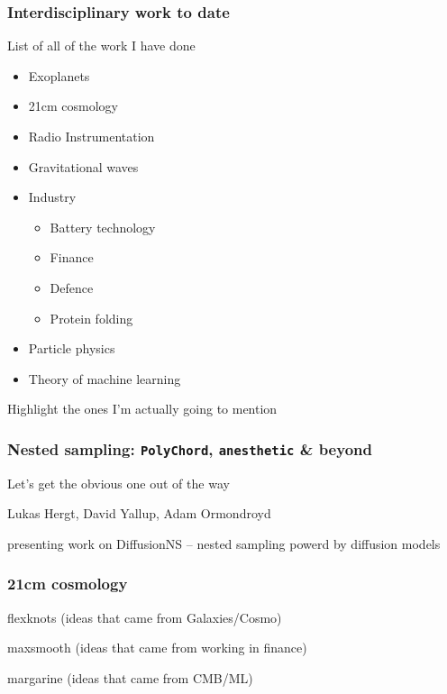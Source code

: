 \documentclass[aspectratio=169, handout]{beamer}
\begin{document}
\begin{frame}
    \frametitle{Interdisciplinary work to date}

    List of all of the work I have done
    \begin{itemize}
        \item Exoplanets
        \item 21cm cosmology
        \item Radio Instrumentation
        \item Gravitational waves
        \item Industry
            \begin{itemize}
                \item Battery technology
                \item Finance
                \item Defence
                \item Protein folding
            \end{itemize}
        \item Particle physics
        \item Theory of machine learning
    \end{itemize}

    Highlight the ones I'm actually going to mention
\end{frame}

\begin{frame}
    \frametitle{Nested sampling: \texttt{PolyChord}, \texttt{anesthetic} \& beyond}
    Let's get the obvious one out of the way

    Lukas Hergt, David Yallup, Adam Ormondroyd

    presenting work on DiffusionNS -- nested sampling powerd by diffusion models
\end{frame}

\begin{frame}
    \frametitle{21cm cosmology}

    flexknots (ideas that came from Galaxies/Cosmo)

    maxsmooth (ideas that came from working in finance)

    margarine (ideas that came from CMB/ML)
\end{frame}
\end{document}
